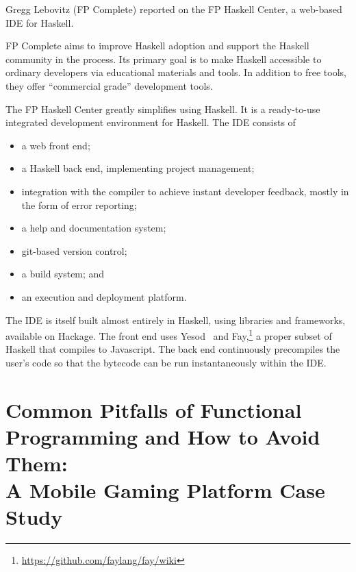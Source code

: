 \documentclass{jfp1}
\begin{document}

Gregg Lebovitz (FP Complete) reported on the FP Haskell Center, 
a web-based IDE for Haskell.  

FP Complete aims to improve Haskell adoption and support the Haskell
community in the process. Its primary goal is to make Haskell accessible
to ordinary developers via educational materials and tools. In addition to
free tools, they offer ``commercial grade'' development tools.

The FP Haskell Center greatly simplifies using Haskell. It is a
ready-to-use integrated development environment for Haskell. The IDE
consists of 

\begin{itemize}

\item a web front end;

\item a Haskell back end, implementing project management;

\item integration with the compiler to achieve instant developer feedback,
mostly in the form of error reporting;

\item a help and documentation system;

\item git-based version control;

\item a build system; and

\item an execution and deployment platform.
\end{itemize}

The IDE is itself built almost entirely in Haskell, using libraries and
frameworks, available on Hackage.  The front end uses
Yesod~\cite{Snoyman:2012:Developing} and
Fay,\footnote{\url{https://github.com/faylang/fay/wiki}} a proper subset
of Haskell that compiles to Javascript. The back end continuously
precompiles the user's code so that the bytecode can be run
instantaneously within the IDE.

\section{Common Pitfalls of Functional Programming and How 
to Avoid Them:\\ A Mobile Gaming Platform Case Study}

\end{document}

